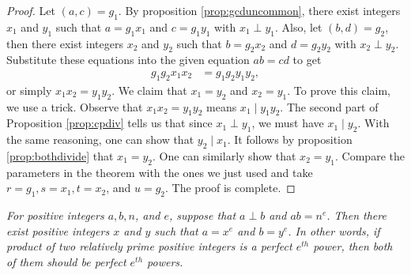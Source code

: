 \documentclass{subfile}
\begin{document}
	\begin{proof}
		Let $(a,c)=g_1$. By proposition \eqref{prop:gcduncommon}, there exist integers $x_1$ and $y_1$ such that $a=g_1x_1$ and $c=g_1y_1$ with $x_1\perp y_1$. Also, let $(b,d)=g_2$, then there exist integers $x_2$ and $y_2$ such that $b=g_2x_2$ and $d=g_2y_2$ with $x_2\perp y_2$. Substitute these equations into the given equation $ab=cd$ to get
		\begin{align*}
			g_1g_2x_1x_2 & =g_1g_2y_1y_2,
		\end{align*}
		or simply $x_1x_2 =y_1y_2$. We claim that $x_1=y_2$ and $x_2=y_1$. To prove this claim, we use a trick. Observe that $x_1x_2=y_1y_2$ means $x_1\mid y_1y_2$. The second part of Proposition \eqref{prop:cpdiv} tells us that since $x_1 \perp y_1$, we must have $x_1\mid y_2$. With the same reasoning, one can show that $y_2\mid x_1$. It follows by proposition \eqref{prop:bothdivide} that $x_1 =y_2$. One can similarly show that $x_2=y_1$. Compare the  parameters in the theorem with the ones we just used and take $r=g_1, s=x_1, t=x_2 $, and $u=g_2$. The proof is complete.
	\end{proof}

	\begin{theorem}\slshape
		For positive integers $a, b, n$, and $e$, suppose that $a\perp b$ and $ab=n^e$. Then there exist positive integers $x$ and $y$ such that $a=x^e$ and $b=y^e$. In other  words, if product of two relatively prime positive integers is a perfect $e^{th}$ power, then both of them should be perfect $e^{th}$ powers. \label{thm:copower}
	\end{theorem}
\end{document}
